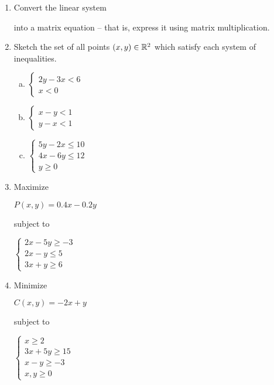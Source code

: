 \documentclass[11pt]{exam}
\begin{document}
\begin{enumerate}
\item Convert the linear system
\begin{center}
\end{center}
into a matrix equation -- that is, express it using matrix multiplication.

\item Sketch the set of all points $(x,y)\in\mathbb{R}^{2}$ which satisfy each system of inequalities.
\begin{multicols}{3}
\begin{enumerate}[(a)]
\item $\begin{cases}2y-3x < 6\\x < 0\end{cases}$
\item $\begin{cases}x - y < 1\\y - x < 1\end{cases}$
\item $\begin{cases}5y-2x\leq 10\\4x - 6y\leq 12\\y \geq 0\end{cases}$
\end{enumerate}
\end{multicols}

\item Maximize 
\begin{center}
$P(x,y) = 0.4x - 0.2y$
\end{center}
subject to
\begin{center}
$\begin{cases}
2x - 5y \geq -3\\
2x - y \leq 5\\
3x + y \geq 6
\end{cases}$
\end{center}
\newpage

\item Minimize
\begin{center}
$C(x,y) = -2x + y$
\end{center}
subject to
\begin{center}
$\begin{cases}
x\geq 2\\
3x + 5y \geq 15\\
x - y \geq -3\\
x,y\geq 0
\end{cases}$
\end{center}


\end{enumerate}
\end{document}
